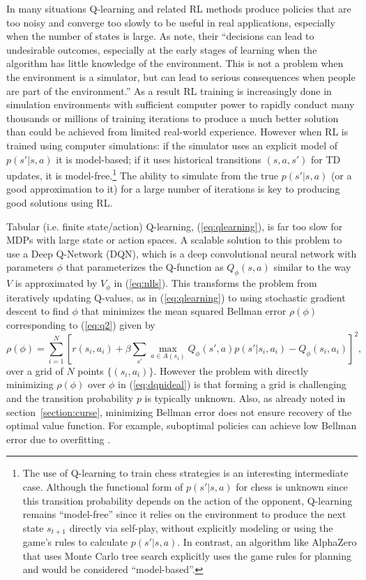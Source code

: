In many situations Q-learning and related RL methods produce policies that
are too noisy and converge too slowly to be useful in 
real applications, especially when the number of states is large.  As \citet{JiangXie:2024} note, their
``decisions can lead to undesirable outcomes, especially at the early stages of learning when the algorithm has little knowledge of the environment. This is not a problem when the environment is a simulator, but can lead to serious consequences when people are part of the environment.''
As a result RL training is increasingly done in simulation environments with
sufficient computer power to rapidly conduct many thousands or millions of training iterations to produce a much better solution than could be achieved
from limited real-world experience.  However when RL is trained using computer simulations:
if the simulator uses an explicit model of $p(s'|s,a)$ it is
model-based; if it uses historical transitions $(s,a,s')$ for TD updates,
it is model-free.\footnote{\footnotesize The use of Q-learning
to train chess strategies is an interesting intermediate case. Although the functional form of $p(s'|s,a)$
for chess is unknown since this transition probability depends on the action of the opponent, Q-learning remains
``model-free'' since it relies on the environment to produce the next state $s_{t+1}$ directly
via self-play, without explicitly modeling or using the game's rules to calculate $p(s'|s,a)$.
In contrast, an algorithm like AlphaZero that uses Monte Carlo tree search explicitly uses the
game rules for planning and would be considered ``model-based''.}  The ability to simulate from the true $p(s'|s,a)$  (or a good approximation to it)
for a large number of iterations is  key to producing good solutions using RL.

Tabular (i.e. finite state/action) Q-learning, (\ref{eq:qlearning}), is far too slow for MDPs with large state or action spaces. 
A scalable solution to this problem to use a  Deep Q-Network (DQN), which is a deep convolutional neural network with parameters $\phi$ 
that parameterizes the Q-function as $Q_\phi(s,a)$ similar to the way $V$ is approximated by $V_\phi$ in (\ref{eq:nlls}).
This transforms the problem from iteratively updating Q-values, as in (\ref{eq:qlearning})
to using stochastic gradient descent to find $\phi$ that minimizes the mean squared Bellman error $\rho(\phi)$ corresponding to
(\ref{eq:q2})  given by
\begin{equation} 
   \rho(\phi) = \sum_{i=1}^N \left[ r(s_i,a_i)+\beta \sum_{s'} \max_{a \in A(s_i)} Q_\phi(s',a)p(s'|s_i,a_i) - Q_\phi(s_i,a_i)\right]^2,
\label{eq:dqnideal}
\end{equation}
over a grid of $N$ points $\{(s_i,a_i)\}$. However the problem with directly
minimizing $\rho(\phi)$ over $\phi$ in (\ref{eq:dqnideal}) is that forming a grid is challenging and the transition probability
$p$ is typically unknown.  Also, as already noted in section~\ref{section:curse},
 minimizing Bellman error does not ensure recovery of the optimal value function. 
For example, suboptimal policies can achieve low Bellman error due to overfitting \citep{fu2019diagnosing}.


